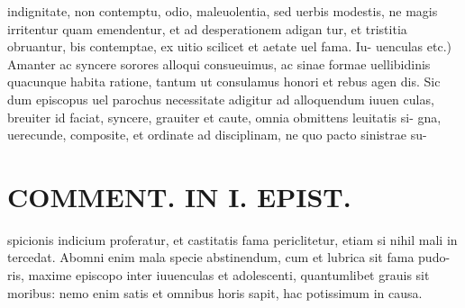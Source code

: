 \documentclass{article}
\begin{document}
\begin{pages}
indignitate, non contemptu, odio, maleuolentia, sed uerbis modestis, ne magis irritentur quam emendentur, et ad desperationem adigan tur, et tristitia obruantur, bis contemptae, ex uitio scilicet et aetate uel fama. Iu- uenculas etc.) Amanter ac syncere sorores alloqui consueuimus, ac sinae formae uellibidinis quacunque habita ratione, tantum ut consulamus honori et rebus agen dis. Sic dum episcopus uel parochus necessitate adigitur ad alloquendum iuuen culas, breuiter id faciat, syncere, grauiter et caute, omnia obmittens leuitatis si- gna, uerecunde, composite, et ordinate ad disciplinam, ne quo pacto sinistrae su-  \pend
\section*{COMMENT. IN I. EPIST. }
\marginpar{[ p.514 ]}\pstart spicionis indicium proferatur, et castitatis fama periclitetur, etiam si nihil mali in tercedat. Abomni enim mala specie abstinendum, cum et lubrica sit fama pudo- ris, maxime episcopo inter iuuenculas et adolescenti, quantumlibet grauis sit moribus: nemo enim satis et omnibus horis sapit, hac potissimum in causa.  \pend
{}
{}

\end{pages}
\end{document}
